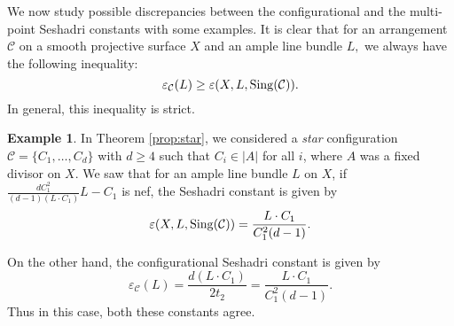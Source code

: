 \documentclass[12pt,reqno]{amsart}
\theoremstyle{plain}
\numberwithin{equation}{section}
\theoremstyle{definition}
\newtheorem{example}[theorem]{Example}
\begin{document}
	We now study possible discrepancies between the configurational and the multi-point Seshadri constants with some examples. It is clear that for an arrangement $\mathcal{C}$ on a smooth projective surface $X$ and an ample line bundle $L,$ we always have the following inequality: 
	$$\varepsilon_\mathcal{C}(L) \geq \varepsilon(X, L,{\rm Sing}(\mathcal{C})).$$
	In general, this inequality is strict. 
	\begin{example}
		In Theorem \ref{prop:star}, we considered a \emph{star} configuration $\mathcal{C} = \{C_{1}, \ldots, C_{d}\}$ with $d \geq 4$ such that $ C_i \in |A|$ for all $i$, where $A$ was a fixed divisor on $X$. We saw that for an ample line bundle $L$  on $X$, if 
		$\frac{dC_1^2}{(d-1)(L\cdot C_1)}L-C_1$ is nef, the Seshadri constant is given by
		$$\varepsilon(X, L,{\rm Sing}(\mathcal{C})) = \frac{L\cdot C_1}{C_1^2(d-1)}.$$
		
		On the other hand, the configurational Seshadri constant is given by
		$$	\varepsilon_\mathcal{C}(L)= \frac{d(L\cdot C_1)}{2t_2}= \frac{L\cdot C_1}{C_1^2(d-1)}.$$
		Thus in this case, both these constants agree.
	\end{example}
	
\end{document}
